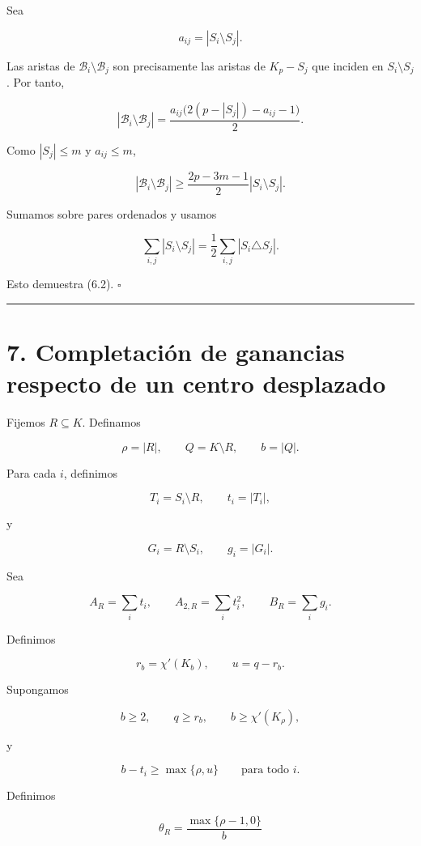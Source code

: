 \documentclass[
  11pt,
]{article}
\begin{document}
Sea

\[
a_{ij}=|S_i\setminus S_j|.
\]

Las aristas de \(\mathcal B_i\setminus\mathcal B_j\) son precisamente
las aristas de \(K_p-S_j\) que inciden en \(S_i\setminus S_j\). Por
tanto,

\[
|\mathcal B_i\setminus\mathcal B_j|
=
\frac{a_{ij}\bigl(2(p-|S_j|)-a_{ij}-1\bigr)}2.
\]

Como \(|S_j|\le m\) y \(a_{ij}\le m\),

\[
|\mathcal B_i\setminus\mathcal B_j|
\ge
\frac{2p-3m-1}{2}|S_i\setminus S_j|.
\]

Sumamos sobre pares ordenados y usamos

\[
\sum_{i,j}|S_i\setminus S_j|
=
\frac12\sum_{i,j}|S_i\triangle S_j|.
\]

Esto demuestra (6.2). \(\square\)

\begin{center}\rule{0.5\linewidth}{0.5pt}\end{center}

\section{7. Completación de ganancias respecto de un centro
desplazado}\label{completaciuxf3n-de-ganancias-respecto-de-un-centro-desplazado}

Fijemos \(R\subseteq K\). Definamos

\[
\rho=|R|,
\qquad
Q=K\setminus R,
\qquad
b=|Q|.
\]

Para cada \(i\), definimos

\[
T_i=S_i\setminus R,
\qquad
t_i=|T_i|,
\]

y

\[
G_i=R\setminus S_i,
\qquad
g_i=|G_i|.
\]

Sea

\[
A_R=\sum_i t_i,
\qquad
A_{2,R}=\sum_i t_i^2,
\qquad
B_R=\sum_i g_i.
\]

Definimos

\[
r_b=\chi'(K_b),
\qquad
u=q-r_b.
\]

Supongamos

\[
b\ge2,
\qquad
q\ge r_b,
\qquad
b\ge\chi'(K_\rho),
\tag{7.1}
\]

y

\[
b-t_i\ge\max\{\rho,u\}
\qquad
\text{para todo }i.
\tag{7.2}
\]

Definimos

\[
\theta_R=\frac{\max\{\rho-1,0\}}{b}
\]
\end{document}
